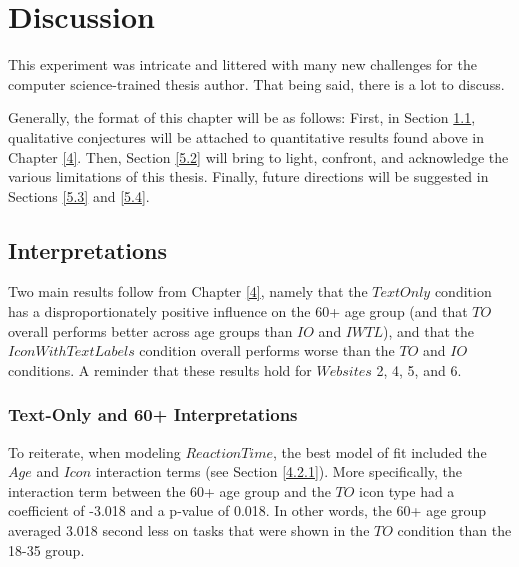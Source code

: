 \documentclass[12pt,twoside]{reedthesis}
\begin{document}
    
\chapter{Discussion}\label{5}

    This experiment was intricate and littered with many new challenges for the computer science-trained thesis author. That being said, there is a lot to discuss. 
    
    Generally, the format of this chapter will be as follows: First, in Section \ref{5.1}, qualitative conjectures will be attached to quantitative results found above in Chapter \ref{4}. Then, Section \ref{5.2} will bring to light, confront, and acknowledge the various limitations of this thesis. Finally, future directions will be suggested in Sections \ref{5.3} and \ref{5.4}.

\section{Interpretations}\label{5.1}
    Two main results follow from Chapter \ref{4}, namely that the $TextOnly$ condition has a disproportionately positive influence on the 60+ age group (and that $TO$ overall performs better across age groups than $IO$ and $IWTL$), and that the $IconWith Text Labels$ condition overall performs worse than the $TO$ and $IO$ conditions. A reminder that these results hold for $Websites$ 2, 4, 5, and 6.

\subsection{Text-Only and 60+ Interpretations}\label{5.1.1}
    To reiterate, when modeling $ReactionTime$, the best model of fit included the $Age$ and $Icon$ interaction terms (see Section \ref{4.2.1}). More specifically, the interaction term between the 60+ age group and the $TO$ icon type had a coefficient of -3.018 and a p-value of 0.018. In other words, the 60+ age group averaged 3.018 second less on tasks that were shown in the $TO$ condition than the 18-35 group.
\end{document}
